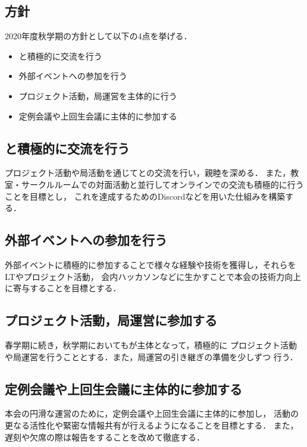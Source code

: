 \subsection*{\newGradeIfKouki{}\secondGrade{}方針}


2020年度秋学期の\secondGrade{}方針として以下の4点を挙げる．

\begin{itemize}
    \item \firstGrade{}と積極的に交流を行う
    \item 外部イベントへの参加を行う
    \item プロジェクト活動，局運営を主体的に行う
    \item 定例会議や上回生会議に主体的に参加する
\end{itemize}

\subsection*{\firstGrade{}と積極的に交流を行う}
プロジェクト活動や局活動を通じて\firstGrade{}との交流を行い，親睦を深める．
また，教室・サークルルームでの対面活動と並行してオンラインでの交流も積極的に行うことを目標とし，
これを達成するためのDiscordなどを用いた仕組みを構築する．

\subsection*{外部イベントへの参加を行う}
外部イベントに積極的に参加することで様々な経験や技術を獲得し，それらをLTやプロジェクト活動，
会内ハッカソンなどに生かすことで本会の技術力向上に寄与することを目標とする．

\subsection*{プロジェクト活動，局運営に参加する}
春学期に続き，秋学期においても\secondGrade{}が主体となって，積極的に
プロジェクト活動や局運営を行うこととする．また，局運営の引き継ぎの準備を少しずつ
行う．

\subsection*{定例会議や上回生会議に主体的に参加する}
本会の円滑な運営のために，定例会議や上回生会議に主体的に参加し，
活動の更なる活性化や緊密な情報共有が行えるようになることを目標とする．
また，遅刻や欠席の際は報告をすることを改めて徹底する．
